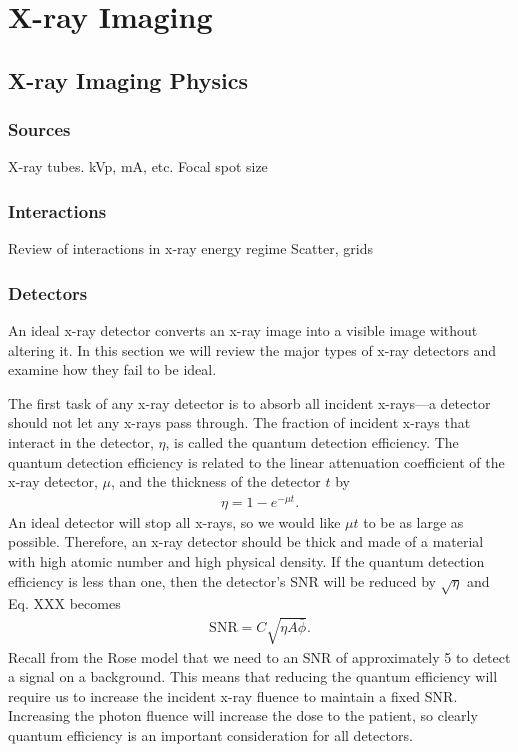 \documentclass[mphy386-notes.tex]{subfiles}
\begin{document}
\section{X-ray Imaging}
\subsection{X-ray Imaging Physics}
\subsubsection{Sources}
X-ray tubes.
kVp, mA, etc.
Focal spot size

\subsubsection{Interactions}
Review of interactions in x-ray energy regime
Scatter, grids

\subsubsection{Detectors}
An ideal x-ray detector converts an x-ray image into a visible image without
altering it. In this section we will review the major types of x-ray detectors
and examine how they fail to be ideal.

The first task of any x-ray detector is to absorb all incident x-rays---a
detector should not let any x-rays pass through. The fraction of incident x-rays
that interact in the detector, $\eta$, is called the quantum detection
efficiency. The quantum detection efficiency is related to the linear
attenuation coefficient of the x-ray detector, $\mu$, and the thickness of the detector $t$ by
\begin{align}
  \eta = 1 - e^{-\mu t}. 
\end{align}
An ideal detector will stop all x-rays, so we would like $\mu t$ to be as large
as possible. Therefore, an x-ray detector should be thick and made of a material
with high atomic number and high physical density. If the quantum detection
efficiency is less than one, then the detector's SNR will be reduced by
$\sqrt{\eta}$ and Eq. XXX becomes
\begin{align}
  \text{SNR} = C\sqrt{\eta A\bar{\phi}}.
\end{align}
Recall from the Rose model that we need to an SNR of approximately 5 to detect a
signal on a background. This means that reducing the quantum efficiency will
require us to increase the incident x-ray fluence to maintain a fixed SNR.
Increasing the photon fluence will increase the dose to the patient, so clearly
quantum efficiency is an important consideration for all detectors.
\end{document}
